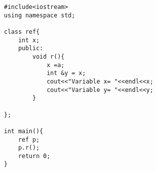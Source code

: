 \begin{lstlisting}
#include<iostream>
using namespace std;

class ref{
	int x;
	public: 
		void r(){
			x =a;
			int &y = x;
			cout<<"Variable x= "<<endl<<x;
			cout<<"Variable y= "<<endl<<y;
		}
		
};

int main(){
	ref p;
	p.r();
	return 0;
}
\end{lstlisting}

